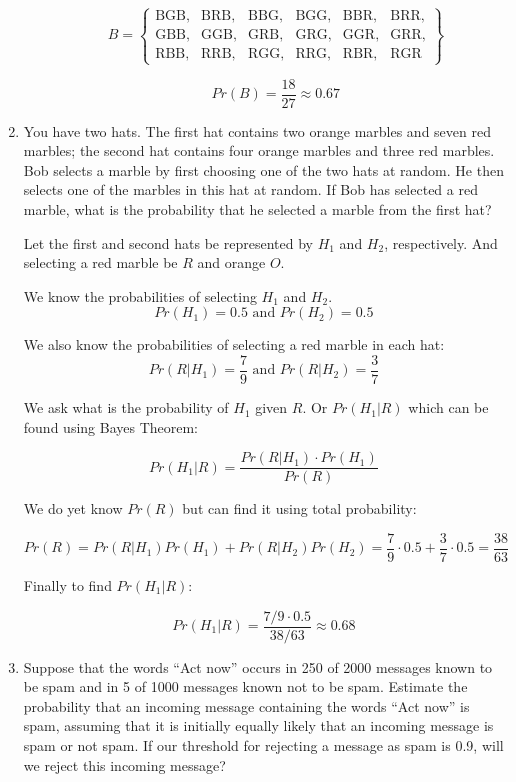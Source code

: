 \documentclass[11pt, letterpaper, includehead]{article}
\theoremstyle{plain}
\theoremstyle{mydefinition}
\theoremstyle{myproperty}
\begin{document}
\begin{enumerate}[label=\textbf{\arabic*}., leftmargin=*]
\begin{enumerate}[label=(\alph*)]
    \[
    B = \left\{
    \begin{array}{llllll}
    \text{BGB}, & \text{BRB}, & \text{BBG}, & \text{BGG}, & \text{BBR}, & \text{BRR}, \\ 
    \text{GBB}, & \text{GGB}, & \text{GRB}, & \text{GRG}, & \text{GGR}, & \text{GRR}, \\
    \text{RBB}, & \text{RRB}, & \text{RGG}, & \text{RRG}, & \text{RBR,} & \text{RGR}
    \end{array}
    \right\}
    \]

    \[Pr(B) = \frac{18}{27} \approx 0.67\]
\end{enumerate}

\item You have two hats. The first hat contains two orange marbles and seven red marbles; the second hat contains four orange marbles and three red marbles. Bob selects a marble by first choosing one of the two hats at random. He then selects one of the marbles in this hat at random. If Bob has selected a red marble, what is the probability that he selected a marble from the first hat?

Let the first and second hats be represented by $H_1$ and $H_2$, respectively. And selecting a red marble be $R$ and orange $O$.

We know the probabilities of selecting $H_1$ and $H_2$.
\[Pr(H_1) = 0.5 \text{ and } Pr(H_2) = 0.5\]

We also know the probabilities of selecting a red marble in each hat:
\[Pr(R|H_1) = \frac{7}{9} \text{ and } Pr(R|H_2) = \frac{3}{7}\]

We ask what is the probability of $H_1$ given $R$. Or $Pr(H_1 | R)$ which can be found using Bayes Theorem:

\[Pr(H_1|R) = \frac{Pr(R|H_1) \cdot Pr(H_1)}{Pr(R)}\]

We do yet know $Pr(R)$ but can find it using total probability:

\[Pr(R) = Pr(R|H_1)Pr(H_1) + Pr(R|H_2)Pr(H_2) = \frac{7}{9} \cdot 0.5 + \frac{3}{7} \cdot 0.5 = \frac{38}{63}\]

Finally to find $Pr(H_1 | R):$

\[Pr(H_1| R) = \frac{ 7/9 \cdot 0.5}{ 38 / 63} \approx 0.68\]

\item  Suppose that the words ``Act now'' occurs in 250 of 2000 messages known to be spam and in 5 of 1000 messages known not to be spam. Estimate the probability that an incoming message containing the words ``Act now'' is spam, assuming that it is initially equally likely that an incoming message is spam or not spam. If our threshold for rejecting a message as spam is 0.9, will we reject this incoming message?


\end{enumerate}
\end{document}
